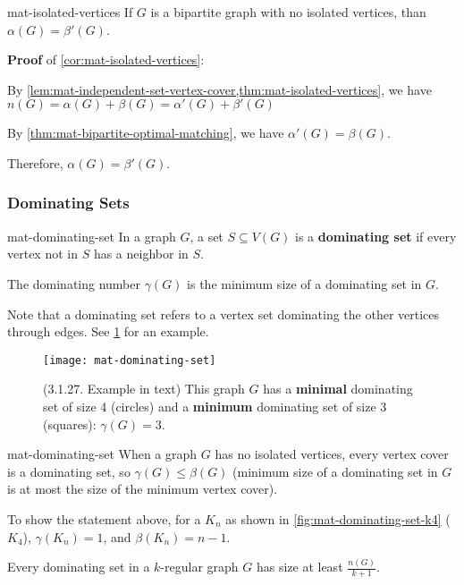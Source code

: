 \documentclass[../src/handouts/main.tex]{subfiles}
\begin{document}
\begin{corollary}{}{mat-isolated-vertices}
  If $G$ is a bipartite graph with no isolated vertices, than $\alpha(G) = \beta'(G)$.
\end{corollary}

\textbf{Proof} of \cref{cor:mat-isolated-vertices}:

\begin{enumerate*}
  \item By \cref{lem:mat-independent-set-vertex-cover,thm:mat-isolated-vertices}, we have
    $n(G) = \alpha(G) + \beta(G) = \alpha'(G) + \beta'(G)$

  \item By \cref{thm:mat-bipartite-optimal-matching}, we have
    $\alpha'(G) = \beta(G)$.

  \item Therefore, $\alpha(G) = \beta'(G)$.
\end{enumerate*}

\subsubsection{Dominating Sets}

\begin{definition}{}{mat-dominating-set}
  In a graph $G$, a set $S \subseteq V(G)$ is a \textbf{dominating set} if every vertex not in $S$ has a neighbor in $S$.

  The dominating number $\gamma(G)$ is the minimum size of a dominating set in $G$.
\end{definition}

Note that a dominating set refers to a vertex set dominating the other vertices through edges. See \cref{fig:mat-dominating-set} for an example.

\begin{figure}
  \centering
  \texttt{[image: mat-dominating-set]}
  \caption{(3.1.27. Example in text) This graph $G$ has a \textbf{minimal} dominating set of size 4 (circles) and a \textbf{minimum} dominating set of size 3 (squares): $\gamma(G)=3$.}
  \label{fig:mat-dominating-set}
\end{figure}

\begin{remark}{}{mat-dominating-set}
  When a graph $G$ has no isolated vertices, every vertex cover is a dominating set, so $\gamma(G) \leq \beta(G)$ (minimum size of a dominating set in $G$ is at most the size of the minimum vertex cover).

  To show the statement above, for a $K_n$ as shown in \cref{fig:mat-dominating-set-k4} ($K_4$), $\gamma \left( K_n \right) = 1$, and $\beta \left( K_n \right) = n - 1$.

  Every dominating set in a $k$-regular graph $G$ has size at least $\frac{n(G)}{k + 1}$.
\end{remark}
\end{document}
